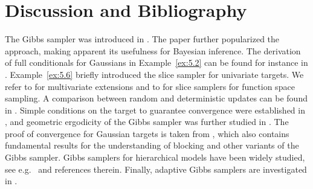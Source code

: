
\section{Discussion and Bibliography}
\label{sec:5.4}

The Gibbs sampler was introduced in \cite{82}. The paper \cite{80} further popularized the
approach, making apparent its usefulness for Bayesian inference. The derivation of full
conditionals for Gaussians in Example~\ref{ex:5.2} can be found for instance in \cite{206}.
Example~\ref{ex:5.6} briefly introduced the slice sampler for univariate targets. We refer
to \cite{169} for multivariate extensions and to \cite{166} for slice samplers for function
space sampling. A comparison between random and deterministic updates can be found in
\cite{8}. Simple conditions on the target to guarantee convergence were established in
\cite{202}, and geometric ergodicity of the Gibbs sampler was further studied in \cite{197}.
The proof of convergence for Gaussian targets is taken from \cite{201}, which also contains
fundamental results for the understanding of blocking and other variants of the Gibbs sampler.
Gibbs samplers for hierarchical models have been widely studied, see e.g.\ \cite{183} and
references therein. Finally, adaptive Gibbs samplers are investigated in \cite{48}.
